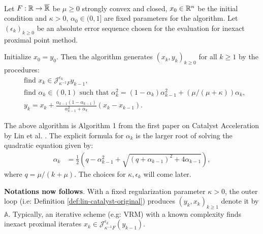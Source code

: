 \documentclass[12pt]{article}
\begin{document}
        \begin{definition}\label{def:lin-catalyst-original}\; \\ 
            Let $F:\mathbb R \rightarrow \overline {\mathbb R}$ be $\mu \ge 0$ strongly convex and closed, $x_0 \in \mathbb R^n$ be the initial condition and $\kappa > 0$, $\alpha_0 \in (0, 1]$ are fixed parameters for the algorithm. 
            Let $(\epsilon_k)_{k \ge 0}$ be an absolute error sequence chosen for the evaluation for inexact proximal point method. 
            \begin{tcolorbox}
                Initialize $x_0 = y_0$. Then the algorithm generates $(x_k, y_k)_{k\ge 0}$ for all $k \ge 1$ by the procedures: 
                \begin{align*}
                    & \text{find } x_k \in \mathcal J_{\kappa^{-1}F}^{\epsilon_k} y_{k - 1}, 
                    \\
                    & \text{find } \alpha_k \in (0, 1) \text{ such that } \alpha_k^2 = (1 - \alpha_k)\alpha_{k - 1}^2 + (\mu/(\mu + \kappa))\alpha_k,
                    \\
                    & 
                    y_{k} = x_k + \frac{\alpha_{k - 1}(1 - \alpha_{k - 1})}{\alpha_{k - 1}^2 + \alpha_k}(x_k - x_{k - 1}). 
                \end{align*}
            \end{tcolorbox}
        \end{definition}
        \begin{remark}
            The above algorithm is Algorithm 1 from the first paper on Catalyst Acceleration by Lin et al. \cite{lin_universal_2015}. 
            The explicit formula for $\alpha_k$ is the larger root of solving the quadratic equation given by: 
            \begin{align*}
                \alpha_k &= 
                \frac{1}{2}\left(
                    q - \alpha_{k - 1}^2 + \sqrt{(q + \alpha_{k - 1})^2 + 4 \alpha_{k - 1}}
                \right), 
            \end{align*}
            where $q = \mu/(k + \mu)$. 
            The choices for $\kappa, \epsilon_k$ will come later. 
        \end{remark}
        \textbf{Notations now follows}. 
        With a fixed regularization parameter $\kappa > 0$, the outer loop (i.e: Definition \ref{def:lin-catalyst-original}) produces $(y_{k}, x_k)_{k \ge 1}$ denote it by $\mathbb A$. 
        Typically, an iterative scheme (e.g: VRM) with a known complexity finds inexact proximal iterates $x_k \in {\mathcal J}_{\kappa^{-1}F}^{\epsilon_k} (y_{k - 1})$. 
\end{document}
